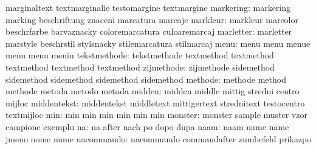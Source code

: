                            marginaltext              textmarginalie
                           testomargine              textmargine
                markering: markering                 marking
                           beschriftung              znaceni
                           marcatura                 marcaje
                 markleur: markleur                  marcolor
                           beschrfarbe               barvaznacky
                           coloremarcatura           culoaremarcaj
                marletter: marletter                 marstyle
                           beschrstil                stylsnacky
                           stilemarcatura            stilmarcaj
                     menu: menu                      menu
                           menue                     menu
                           menu                      meniu
             tekstmethode: tekstmethode              textmethod
                           textmethod                textmethod
                           textmethod                textmethod
               zijmethode: zijmethode                sidemethod
                           sidemethod                sidemethod
                           sidemethod                sidemethod
                  methode: methode                   method
                           methode                   metoda
                           metodo                    metoda
                   midden: midden                    middle
                           mittig                    stredni
                           centro                    mijloc %
              middentekst: middentekst               middletext
                           mittigertext              strednitext
                           testocentro               textmijloc %
                      min: min                       min
                           min                       min
                           min                       min
                  monster: monster                   sample
                           muster                    vzor
                           campione                  exemplu
                       na: na                        after
                           nach                      po
                           dopo                      dupa
                     naam: naam                      name
                           name                      jmeno
                           nome                      nume
               nacommando: nacommando                commandafter
                           zumbefehl                 prikazpo
